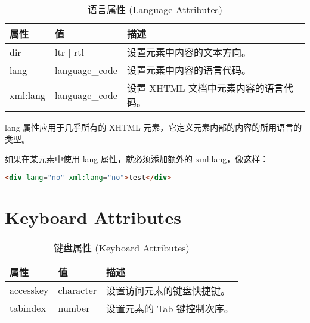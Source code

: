 \begin{table}[!h]
\centering
\caption{语言属性 (Language Attributes)}
\begin{tabular}{|l|l|l|}
\hline
属性		&值		&描述\\
\hline
dir		&ltr | rtl	&设置元素中内容的文本方向。\\
\hline
lang		&language\_code&	设置元素中内容的语言代码。\\
\hline
xml:lang	&language\_code&	设置 XHTML 文档中元素内容的语言代码。\\
\hline
\end{tabular}
\end{table}

lang 属性应用于几乎所有的 XHTML 元素，它定义元素内部的内容的所用语言的类型。

如果在某元素中使用 lang 属性，就必须添加额外的 xml:lang，像这样：

\begin{lstlisting}[language=HTML]
<div lang="no" xml:lang="no">test</div>
\end{lstlisting}



\section{Keyboard Attributes}


\begin{table}[!h]
\centering
\caption{键盘属性 (Keyboard Attributes)}
\begin{tabular}{|l|l|l|}
\hline
属性			&值			&描述\\
\hline
accesskey	&character	&设置访问元素的键盘快捷键。\\
\hline
tabindex		&number		&设置元素的 Tab 键控制次序。\\
\hline
\end{tabular}
\end{table}
































































